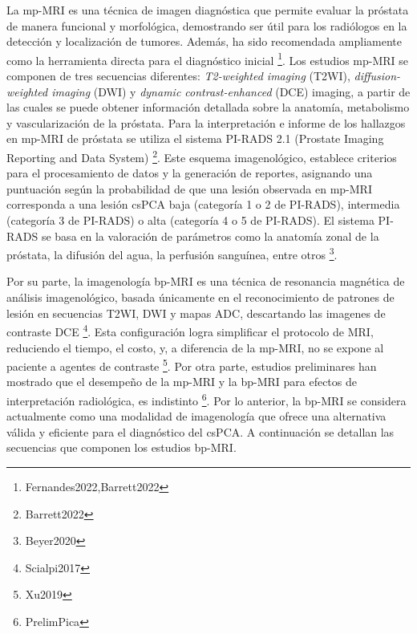 La mp-MRI es una técnica de imagen diagnóstica que permite evaluar la próstata de manera funcional y morfológica, demostrando ser útil para los radiólogos en la detección y localización de tumores. Además, ha sido recomendada ampliamente como la herramienta directa para el diagnóstico inicial \footnote{Fernandes2022,Barrett2022}. Los estudios mp-MRI se componen de tres secuencias diferentes: \textit{T2-weighted imaging} (T2WI), \textit{diffusion-weighted imaging} (DWI) y \textit{dynamic contrast-enhanced} (DCE) imaging, a partir de las cuales se puede obtener información detallada sobre la anatomía, metabolismo y vascularización de la próstata. Para la interpretación e informe de los hallazgos en mp-MRI de próstata se utiliza el sistema PI-RADS 2.1 (Prostate Imaging Reporting and Data System) \footnote{Barrett2022}. Este esquema imagenológico, establece criterios para el procesamiento de datos y la generación de reportes, asignando una puntuación según la probabilidad de que una lesión observada en mp-MRI corresponda a una lesión csPCA baja (categoría 1 o 2 de PI-RADS), intermedia (categoría 3 de PI-RADS) o alta (categoría 4 o 5 de PI-RADS). El sistema PI-RADS se basa en la valoración de parámetros como la anatomía zonal de la próstata, la difusión del agua, la perfusión sanguínea, entre otros \footnote{Beyer2020}.\par

Por su parte, la imagenología bp-MRI es una técnica de resonancia magnética de análisis imagenológico, basada únicamente en el reconocimiento de patrones de lesión en secuencias T2WI, DWI y mapas ADC, descartando las imagenes de contraste DCE \footnote{Scialpi2017}. Esta configuración logra simplificar el protocolo de MRI, reduciendo el tiempo, el costo, y, a diferencia de la mp-MRI, no se expone al paciente a agentes de contraste \footnote{Xu2019}. Por otra parte, estudios preliminares han mostrado que el desempeño de la mp-MRI y la bp-MRI para efectos de interpretación radiológica, es indistinto \footnote{PrelimPica}. Por lo anterior, la bp-MRI se considera actualmente como una modalidad de imagenología que ofrece una alternativa válida y eficiente para el diagnóstico del csPCA. A continuación se detallan las secuencias que componen los estudios bp-MRI.

